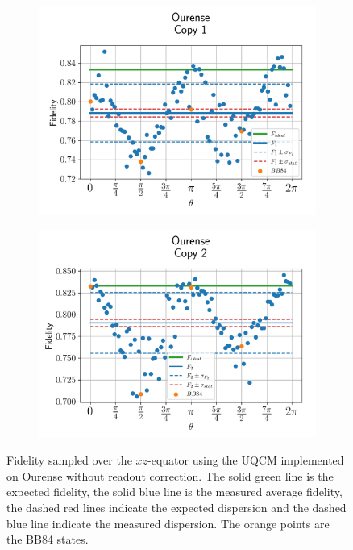 \begin{figure}[H]
    \centering
    \begin{subfigure}{.45\textwidth}
      \centering
      \includegraphics[width=\textwidth]{Figures/UQCM/IBM/OnlyEquator/results_ourense_copy1.png}
    \end{subfigure}%
    \begin{subfigure}{.45\textwidth}
      \centering
      \includegraphics[width=\textwidth]{Figures/UQCM/IBM/OnlyEquator/results_ourense_copy2.png}
    \end{subfigure}
    \caption{Fidelity sampled over the $xz$-equator using the UQCM implemented on Ourense without readout correction. The solid green line is the expected fidelity, the solid blue line is the measured average fidelity, the dashed red lines indicate the expected dispersion and the dashed blue line indicate the measured dispersion. The orange points are the BB84 states.}
\end{figure}


